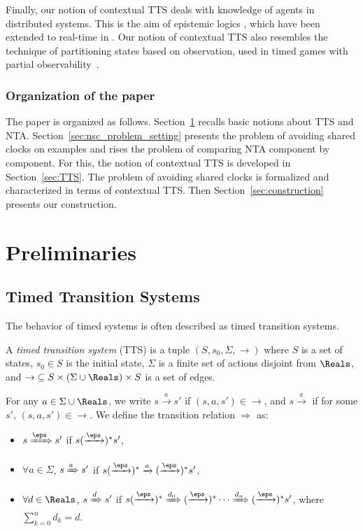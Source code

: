 \documentclass{LMCS}
\theoremstyle{plain}\newtheorem*{prop11}{Proposition~\ref{prop:states} bis}
\begin{document}
Finally, our notion of contextual TTS deals with knowledge of agents in
distributed systems. This is the aim of epistemic logics
\cite{ReasoningAboutKnowledge},
which have been extended to real-time in \cite{WoznaL04, Dima09}.
Our notion of contextual TTS also resembles the technique of partitioning
states based on observation, used in timed games with partial observability~\cite{Bouyer03,David09}.


\subsubsection*{Organization of the paper}
The paper is organized as follows. Section~\ref{sec:preliminaries} recalls basic
notions about TTS and NTA\@. Section~\ref{sec:nsc_problem_setting} presents the
problem of avoiding shared clocks on examples and rises the problem of comparing
NTA component by component. For this, the notion of contextual TTS is developed
in Section~\ref{sec:TTS}. The problem of avoiding shared clocks is formalized
and characterized in terms of contextual TTS\@. Then
Section~\ref{sec:construction} presents our construction.




\section{Preliminaries}\label{sec:preliminaries}                               \subsection{Timed Transition Systems}
The behavior of timed systems is often described as timed transition systems.
\begin{defi}A \emph{timed transition system} (TTS)
  is a tuple \mbox{$(S, s_0 , \Sigma, {\rightarrow})$}
  where
  $S$ is a set of states,
  $s_0 \in S$ is the initial state,
  $\Sigma$ is a finite set of actions disjoint from $\Reals$, and
  ${\rightarrow} \subseteq S \times (\Sigma \cup \Reals ) \times S$
  is a set of edges.
\end{defi}
For any $a\in\Sigma\cup\Reals $, we write $s\xrightarrow{a}s'$ if
\mbox{$(s,a,s')\in{\rightarrow}$}, and $s\xrightarrow{a}$ if for some $s'$,
\mbox{$(s,a,s')\in{\rightarrow}$}. We define the transition relation $\Rightarrow$ as:
\begin{itemize}
  \item $s\xRightarrow{\eps} s'$ if $s(\xrightarrow{\eps})^*s'$,
  \item $\forall a\in\Sigma$,
  $s\xRightarrow{a} s'$ if $s(\xrightarrow{\eps})^*
  \xrightarrow{a}(\xrightarrow{\eps})^* s'$,
  \item $\forall d\in\Reals$,
  $s\xRightarrow{d} s'$ if $s(\xrightarrow{\eps})^*
  \xRightarrow{d_0}(\xrightarrow{\eps})^*\cdots
  \xRightarrow{d_n}(\xrightarrow{\eps})^* s'$, where
  $\sum_{k=0}^n d_k=d$.
\end{itemize}
\end{document}
